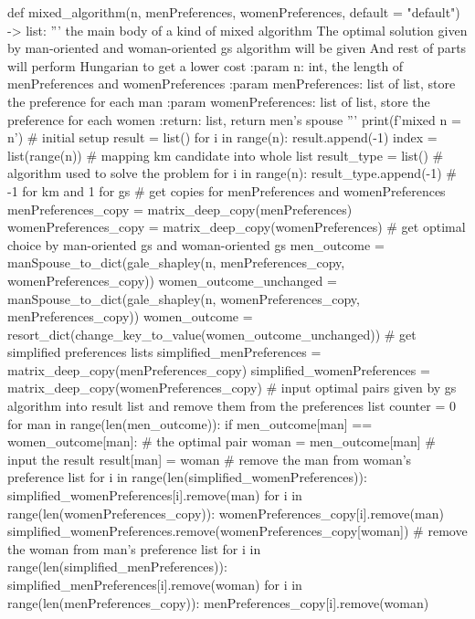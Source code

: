 \documentclass[14pt]{extarticle}
\begin{document}
\begin{python}
def mixed_algorithm(n, menPreferences, womenPreferences, default = "default") -> list:
    '''
    the main body of a kind of mixed algorithm
    The optimal solution given by man-oriented and woman-oriented gs algorithm will be given
    And rest of parts will perform Hungarian to get a lower cost
    :param n: int, the length of menPreferences and womenPreferences
    :param menPreferences: list of list, store the preference for each man
    :param womenPreferences: list of list, store the preference for each women
    :return: list, return men's spouse
    '''
    print(f'mixed n = {n}')
    # initial setup
    result = list()
    for i in range(n):
        result.append(-1)
    index = list(range(n)) # mapping km candidate into whole list
    result_type = list() # algorithm used to solve the problem
    for i in range(n):
        result_type.append(-1) # -1 for km and 1 for gs
    # get copies for menPreferences and womenPreferences
    menPreferences_copy = matrix_deep_copy(menPreferences)
    womenPreferences_copy =  matrix_deep_copy(womenPreferences)   
    # get optimal choice by man-oriented gs and woman-oriented gs
    men_outcome = manSpouse_to_dict(gale_shapley(n, menPreferences_copy, womenPreferences_copy))
    women_outcome_unchanged = manSpouse_to_dict(gale_shapley(n, womenPreferences_copy, menPreferences_copy))
    women_outcome = resort_dict(change_key_to_value(women_outcome_unchanged))
    # get simplified preferences lists 
    simplified_menPreferences = matrix_deep_copy(menPreferences_copy)
    simplified_womenPreferences = matrix_deep_copy(womenPreferences_copy)
    # input optimal pairs given by gs algorithm into result list and remove them from the preferences list
    counter = 0
    for man in range(len(men_outcome)):
        if men_outcome[man] == women_outcome[man]:
            # the optimal pair
            woman = men_outcome[man]
            # input the result
            result[man] = woman
            # remove the man from woman's preference list
            for i in range(len(simplified_womenPreferences)):
                simplified_womenPreferences[i].remove(man)
            for i in range(len(womenPreferences_copy)):
                womenPreferences_copy[i].remove(man)
            simplified_womenPreferences.remove(womenPreferences_copy[woman]) 
            # remove the woman from man's preference list
            for i in range(len(simplified_menPreferences)):
                simplified_menPreferences[i].remove(woman)   
            for i in range(len(menPreferences_copy)):
                menPreferences_copy[i].remove(woman) 

\end{python}
\end{document}
